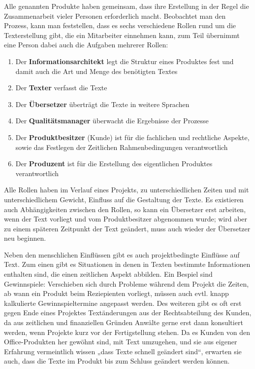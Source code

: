\documentclass[11pt,a4paper]{article}
\begin{document}
Alle genannten Produkte haben gemeinsam, dass ihre Erstellung in der Regel die Zusammenarbeit vieler Personen erforderlich macht. Beobachtet man den Prozess, kann man feststellen, dass es sechs verschiedene Rollen rund um die Texterstellung gibt, die ein Mitarbeiter einnehmen kann, zum Teil übernimmt eine Person dabei auch die Aufgaben mehrerer Rollen:
\begin{enumerate}
\addtolength{\itemsep}{-0.5\baselineskip}
\item Der \textbf{Informationsarchitekt} legt die Struktur eines Produktes fest und damit auch die Art und Menge des benötigten Textes
\item Der \textbf{Texter} verfasst die Texte
\item Der \textbf{Übersetzer} überträgt die Texte in weitere Sprachen
\item Der \textbf{Qualitätsmanager} überwacht die Ergebnisse der Prozesse 
\item Der \textbf{Produktbesitzer} (Kunde) ist für die fachlichen und rechtliche Aspekte, sowie das Festlegen der Zeitlichen Rahmenbedingungen verantwortlich
\item Der \textbf{Produzent} ist für die Erstellung des eigentlichen Produktes verantwortlich
\end{enumerate}
Alle Rollen haben im Verlauf eines Projekts, zu unterschiedlichen Zeiten und mit unterschiedlichem Gewicht, Einfluss auf die Gestaltung der Texte. Es existieren auch Abhängigkeiten zwischen den Rollen, so kann ein Übersetzer erst arbeiten, wenn der Text vorliegt und vom Produktbesitzer abgenommen wurde; wird aber zu einem späteren Zeitpunkt der Text geändert, muss auch wieder der Übersetzer neu beginnen.

Neben den menschlichen Einflüssen gibt es auch projektbedingte Einflüsse auf Text. Zum einen gibt es Situationen in denen in Texten bestimmte Informationen enthalten sind, die einen zeitlichen Aspekt abbilden. Ein Bespiel sind Gewinnspiele: Verschieben sich durch Probleme während dem Projekt die Zeiten, ab wann ein Produkt beim Reziepienten vorliegt, müssen auch evtl. knapp kalkulierte Gewinnspieltermine angepasst werden. Des weiteren gibt es oft erst gegen Ende eines Projektes Textänderungen aus der Rechtsabteilung des Kunden, da aus zeitlichen und finanziellen Gründen Anwälte gerne erst dann konsultiert werden, wenn Projekte kurz vor der Fertigstellung stehen. Da es Kunden von den Office-Produkten her gewöhnt sind, mit Text umzugehen, und sie aus eigener Erfahrung vermeintlich wissen „dass Texte schnell geändert sind“, erwarten sie auch, dass die Texte im Produkt bis zum Schluss geändert werden können.
\end{document}
